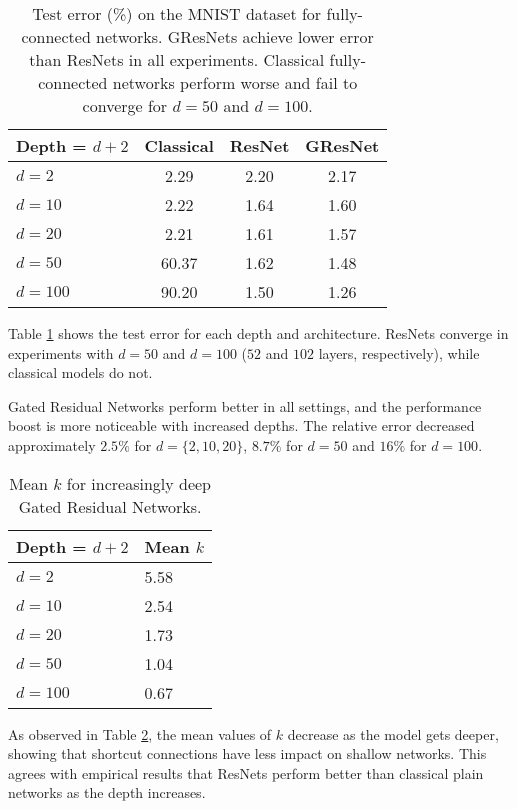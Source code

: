 \documentclass{article} \RequirePackage{amsmath,amsthm,amsfonts,amssymb}
\begin{document}
\begin{table}[h!]
\centering
    \begin{tabular}{ | l | c | c | c |}
    \hline
    Depth = $d+2$ & Classical & ResNet & GResNet \\ \hline
    $d=2$  & 			2.29 & 	2.20 & 	2.17 \\ \hline
    $d=10$ & 			2.22 & 	1.64 & 	1.60 \\ \hline
    $d=20$ & 			2.21 & 	1.61 & 	1.57 \\ \hline
    $d=50$ & 			60.37 & 	1.62 & 	1.48 	\\ \hline
    $d=100$ &		90.20 & 	1.50 & 	1.26 	\\ \hline
    \end{tabular}
\caption{Test error (\%) on the MNIST dataset for fully-connected networks. GResNets achieve lower error than ResNets in all experiments. Classical fully-connected networks perform worse and fail to converge for $d = 50$ and $d = 100$.}
    \label{mnist_table}   
\end{table}

Table \ref{mnist_table} shows the test error for each depth and architecture. ResNets converge in experiments with $d = 50$ and $d = 100$ ($52$ and $102$ layers, respectively), while classical models do not. 

Gated Residual Networks perform better in all settings, and the performance boost is more noticeable with increased depths. The relative error decreased approximately $2.5 \%$ for $d = \{2,10,20\}$, $8.7 \%$ for $d=50$ and $16\%$ for $d = 100$.

\begin{table}[h!]
\centering
    \begin{tabular}{ | l | l |}
    \hline
    Depth = $d+2$ & Mean $k$ \\ \hline
    $d=2 $ & 			5.58 	\\ \hline
    $d=10$ & 			2.54	\\ \hline
    $d=20$ & 			1.73	\\ \hline
    $d=50$ & 			1.04 	\\ \hline
    $d=100$ & 			0.67 	\\ \hline
    \end{tabular}
\caption{Mean $k$ for increasingly deep Gated Residual Networks.}
    \label{mnist_k}   
\end{table}

As observed in Table \ref{mnist_k}, the mean values of $k$ decrease as the model gets deeper, showing that shortcut connections have less impact on shallow networks. This agrees with empirical results that ResNets perform better than classical plain networks as the depth increases.
\end{document}

